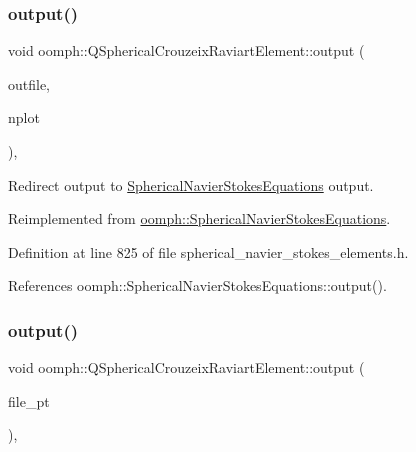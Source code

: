 \subsubsection{\texorpdfstring{output()}{output()}\hspace{0.1cm}{\footnotesize\ttfamily [2/4]}}
{\footnotesize\ttfamily void oomph\+::\+Q\+Spherical\+Crouzeix\+Raviart\+Element\+::output (\begin{DoxyParamCaption}\item[{std\+::ostream \&}]{outfile,  }\item[{const unsigned \&}]{nplot }\end{DoxyParamCaption})\hspace{0.3cm}{\ttfamily [inline]}, {\ttfamily [virtual]}}



Redirect output to \hyperlink{classoomph_1_1SphericalNavierStokesEquations}{Spherical\+Navier\+Stokes\+Equations} output. 



Reimplemented from \hyperlink{classoomph_1_1SphericalNavierStokesEquations_a5506adeb5ecb11e16254b5ee48049c5d}{oomph\+::\+Spherical\+Navier\+Stokes\+Equations}.



Definition at line 825 of file spherical\+\_\+navier\+\_\+stokes\+\_\+elements.\+h.



References oomph\+::\+Spherical\+Navier\+Stokes\+Equations\+::output().

\mbox{\label{classoomph_1_1QSphericalCrouzeixRaviartElement_a885098531e6431711647b581817af3c5}} 
\subsubsection{\texorpdfstring{output()}{output()}\hspace{0.1cm}{\footnotesize\ttfamily [3/4]}}
{\footnotesize\ttfamily void oomph\+::\+Q\+Spherical\+Crouzeix\+Raviart\+Element\+::output (\begin{DoxyParamCaption}\item[{F\+I\+LE $\ast$}]{file\+\_\+pt }\end{DoxyParamCaption})\hspace{0.3cm}{\ttfamily [inline]}, {\ttfamily [virtual]}}



